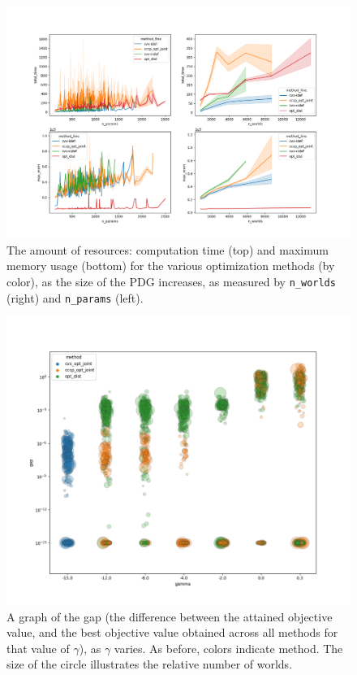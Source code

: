 \documentclass{article}
\begin{document}
\begin{figure}
    \includegraphics[width=\linewidth]{figs/resources-fine}
    \caption{
        The amount of resources: computation time (top) and maximum memory usage (bottom) for the various optimization methods (by color), as the size of the PDG increases, as measured by \texttt{n\_worlds} (right) and \texttt{n\_params} (left).
     }\label{fig:resources}
\end{figure}

\begin{figure}
    \includegraphics[width=\linewidth]{figs/gamma-vs-gap-bettergap}
    \caption{
        A graph of the gap (the difference between the attained objective value, and the best objective value obtained across all methods for that value of $\gamma$),
        as $\gamma$ varies. As before, colors indicate method.
        The size of the circle illustrates the relative number of worlds.
    }\label{fig:gamma-v-gap}
\end{figure}
\end{document}
